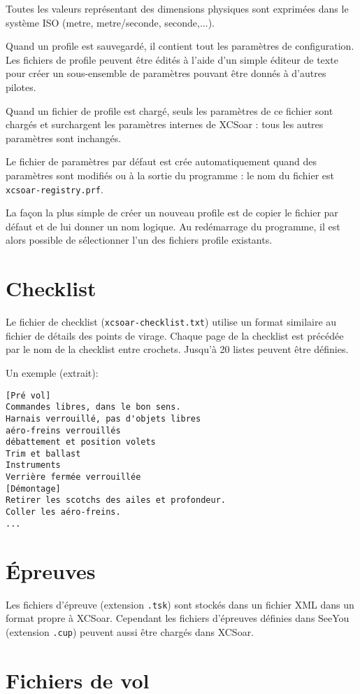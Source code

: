 Toutes les valeurs représentant des dimensions physiques sont exprimées dans le système ISO (metre, metre/seconde, seconde,...).

Quand un profile est sauvegardé, il contient tout les paramètres de configuration. Les fichiers de profile peuvent être édités à l'aide d'un simple éditeur de texte pour créer un sous-ensemble de paramètres pouvant être donnés à d'autres pilotes.

Quand un fichier de profile est chargé, seuls les paramètres de ce fichier sont chargés et surchargent les paramètres internes de XCSoar : tous les autres paramètres sont inchangés.

Le fichier de paramètres par défaut est crée automatiquement quand des paramètres sont modifiés ou à la sortie du programme : le nom du fichier est \verb|xcsoar-registry.prf|.

La façon la plus simple de créer un nouveau profile est de copier le fichier par défaut et de lui donner un nom logique. Au redémarrage du programme, il est alors possible de sélectionner l'un des fichiers profile existants.


\section{Checklist}
Le fichier de checklist (\verb|xcsoar-checklist.txt|) utilise un format similaire au fichier de détails des points de virage. Chaque page de la checklist est précédée par le nom de la checklist entre crochets. Jusqu'à 20 listes peuvent être définies.

Un exemple (extrait):
\begin{verbatim}
[Pré vol]
Commandes libres, dans le bon sens.
Harnais verrouillé, pas d'objets libres
aéro-freins verrouillés
débattement et position volets
Trim et ballast
Instruments
Verrière fermée verrouillée
[Démontage]
Retirer les scotchs des ailes et profondeur.
Coller les aéro-freins.
...
\end{verbatim}

\section{Épreuves}

Les fichiers d'épreuve (extension \verb|.tsk|) sont stockés dans un fichier XML dans un format propre à XCSoar. Cependant les fichiers d'épreuves définies dans SeeYou  (extension \verb|.cup|) peuvent aussi être chargés dans XCSoar.


\section{Fichiers de vol} \label{sec:logfiles}


